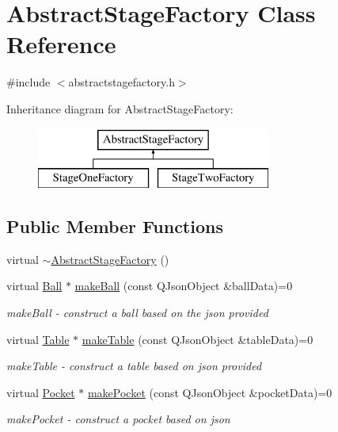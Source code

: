 \hypertarget{class_abstract_stage_factory}{}\section{Abstract\+Stage\+Factory Class Reference}
\label{class_abstract_stage_factory}


{\ttfamily \#include $<$abstractstagefactory.\+h$>$}

Inheritance diagram for Abstract\+Stage\+Factory\+:\begin{figure}[H]
\begin{center}
\leavevmode
\includegraphics[height=2.000000cm]{class_abstract_stage_factory}
\end{center}
\end{figure}
\subsection*{Public Member Functions}
\begin{DoxyCompactItemize}
\item 
virtual \mbox{\hyperlink{class_abstract_stage_factory_a7a38775e61d51152b2331c83b6815404}{$\sim$\+Abstract\+Stage\+Factory}} ()
\item 
virtual \mbox{\hyperlink{class_ball}{Ball}} $\ast$ \mbox{\hyperlink{class_abstract_stage_factory_a23367d64366e679aaff865620f5ce1ab}{make\+Ball}} (const Q\+Json\+Object \&ball\+Data)=0
\begin{DoxyCompactList}\small\item\em make\+Ball -\/ construct a ball based on the json provided \end{DoxyCompactList}\item 
virtual \mbox{\hyperlink{class_table}{Table}} $\ast$ \mbox{\hyperlink{class_abstract_stage_factory_a539c855ce9a09e08b7fcb3ffa7f0d3fd}{make\+Table}} (const Q\+Json\+Object \&table\+Data)=0
\begin{DoxyCompactList}\small\item\em make\+Table -\/ construct a table based on json provided \end{DoxyCompactList}\item 
virtual \mbox{\hyperlink{class_pocket}{Pocket}} $\ast$ \mbox{\hyperlink{class_abstract_stage_factory_a6ce57859e00b135049e3b995b7dfc94d}{make\+Pocket}} (const Q\+Json\+Object \&pocket\+Data)=0
\begin{DoxyCompactList}\small\item\em make\+Pocket -\/ construct a pocket based on json \end{DoxyCompactList}\end{DoxyCompactItemize}


